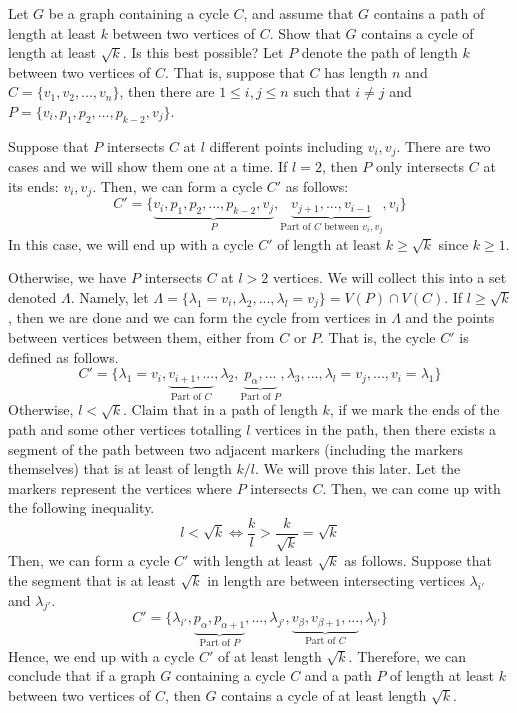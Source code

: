 \begin{hwproblem}{6}{
    Let $G$ be a graph containing a cycle $C$, and assume that $G$
    contains a path of length at least $k$ between two vertices of $C$. Show 
    that $G$ contains a cycle of length at least $\sqrt{k}$. Is this best 
    possible?
  }
  Let \(P\) denote the path of length \(k\) between two vertices of \(C\). That
  is, suppose that \(C\) has length \(n\) and \(C = \{v_1, v_2, ..., v_n\}\),
  then there are \(1 \leq i, j \leq n\) such that \(i \neq j\) and \(P =
  \{v_i, p_1, p_2, ..., p_{k-2}, v_j\}\).

  Suppose that \(P\) intersects \(C\) at \(l\) different points including \(v_i,
  v_j\). There are two cases and we will show them one at a time.
  If \(l = 2\), then \(P\) only intersects \(C\) at its ends: \(v_i, v_j\).
  Then, we can form a cycle \(C'\) as follows:
  \[ C' = \{\underbrace{v_i, p_1, p_2, ..., p_{k-2}, v_{j}}_P, \underbrace{
  v_{j+1}, ..., v_{i-1}}_\text{Part of \(C\) between \(v_i, v_j\)}, v_i \} \]
  In this case, we will end up with a cycle \(C'\) of length at least \(k \geq
  \sqrt{k}\) since \(k \geq 1\).

  Otherwise, we have \(P\) intersects \(C\) at \(l > 2\) vertices. We will 
  collect this into a set denoted \(\Lambda\). Namely, let \(\Lambda
  = \{\lambda_1=v_i, \lambda_2, ..., \lambda_l=v_j\} = V(P) \cap V(C)\). If 
  \(l \geq \sqrt{k}\), then we are done and we can form the cycle from vertices 
  in \(\Lambda\) and the points between vertices between them, either from \(C\)
  or \(P\). That is, the cycle \(C'\) is defined as follows.
  \[
    C' = \{ \lambda_1 = v_i, \underbrace{v_{i+1}, ...}_\text{Part of \(C\)}, 
          \lambda_2, \underbrace{p_{\alpha}, ...}_\text{Part of \(P\)}, \lambda_3,
          ..., \lambda_l = v_j, ..., v_i=\lambda_1 \}
  \]
  Otherwise, \(l < \sqrt{k}\). Claim that in a path of length \(k\), if we
  mark the ends of the path and some other vertices totalling \(l\) vertices 
  in the path, then there exists a segment of the path between two adjacent 
  markers (including the markers themselves) that is at least of length \(k/l\).
  We will prove this later. Let the markers represent the vertices where \(P\)
  intersects \(C\). Then, we can come up with the following inequality.
  \[ l < \sqrt{k} \iff \frac{k}{l} > \frac{k}{\sqrt{k}} = \sqrt{k} \]
  Then, we can form a cycle \(C'\) with length at least \(\sqrt k\) as follows.
  Suppose that the segment that is at least \(\sqrt k\) in length are between
  intersecting vertices \(\lambda_{i'}\) and \(\lambda_{j'}\).
  \[ C' = \{\lambda_{i'}, \underbrace{p_{\alpha}, p_{\alpha+1}}_\text{Part of
  \(P\)}, ..., \lambda_{j'}, \underbrace{v_{\beta}, v_{\beta+1}, ...}_\text{Part
  of \(C\)}, \lambda_{i'}\} \]
  Hence, we end up with a cycle \(C'\) of at least length \(\sqrt k\).
  Therefore, we can conclude that if a graph \(G\) containing a cycle \(C\) and a
  path \(P\) of length at least \(k\) between two vertices of \(C\), then \(G\)
  contains a cycle of at least length \(\sqrt k\).


\end{hwproblem}
